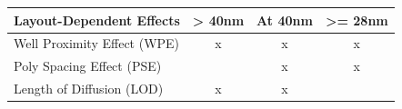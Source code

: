 \documentclass[
]{article}
\begin{document}
\begin{longtable}[]{@{}lccc@{}}
\toprule
\begin{minipage}[b]{0.50\columnwidth}\raggedright
Layout-Dependent Effects\strut
\end{minipage} & \begin{minipage}[b]{0.12\columnwidth}\centering
\textgreater{} 40nm\strut
\end{minipage} & \begin{minipage}[b]{0.12\columnwidth}\centering
At 40nm\strut
\end{minipage} & \begin{minipage}[b]{0.14\columnwidth}\centering
\textgreater= 28nm\strut
\end{minipage}\tabularnewline
\midrule
\endhead
\begin{minipage}[t]{0.50\columnwidth}\raggedright
Well Proximity Effect (WPE)\strut
\end{minipage} & \begin{minipage}[t]{0.12\columnwidth}\centering
x\strut
\end{minipage} & \begin{minipage}[t]{0.12\columnwidth}\centering
x\strut
\end{minipage} & \begin{minipage}[t]{0.14\columnwidth}\centering
x\strut
\end{minipage}\tabularnewline
\begin{minipage}[t]{0.50\columnwidth}\raggedright
Poly Spacing Effect (PSE)\strut
\end{minipage} & \begin{minipage}[t]{0.12\columnwidth}\centering
\strut
\end{minipage} & \begin{minipage}[t]{0.12\columnwidth}\centering
x\strut
\end{minipage} & \begin{minipage}[t]{0.14\columnwidth}\centering
x\strut
\end{minipage}\tabularnewline
\begin{minipage}[t]{0.50\columnwidth}\raggedright
Length of Diffusion (LOD)\strut
\end{minipage} & \begin{minipage}[t]{0.12\columnwidth}\centering
x\strut
\end{minipage} & \begin{minipage}[t]{0.12\columnwidth}\centering
x\strut
\end{minipage} & \begin{minipage}[t]{0.14\columnwidth}\centering

\end{minipage}
\end{longtable}
\end{document}
